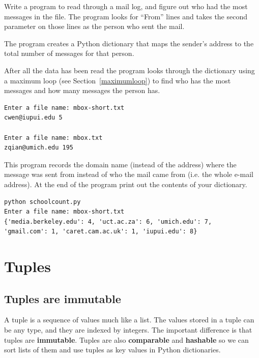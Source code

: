 \documentclass[10pt]{book}
\begin{document}
\begin{ex}
Write a program to read through a mail log, and figure 
out who had the most messages in the file.  The program looks 
for ``From'' lines and takes the second parameter on those 
lines as the person who sent the mail.

The program creates a Python dictionary that maps 
the sender's address to the total number of messages for that person.

After all the data has been read the program looks 
through the dictionary using a maximum loop
 (see Section~\ref{maximumloop})
to find who has the most 
messages and how many messages the person has.

\beforeverb
\begin{verbatim}
Enter a file name: mbox-short.txt
cwen@iupui.edu 5

Enter a file name: mbox.txt
zqian@umich.edu 195
\end{verbatim}
\afterverb
\end{ex}

\begin{ex}
This program records the domain name (instead of the address) 
where the message was sent from instead of who the mail 
came from (i.e. the whole e-mail address). At the end 
of the program print out the contents of your dictionary. 

\beforeverb
\begin{verbatim}
python schoolcount.py
Enter a file name: mbox-short.txt
{'media.berkeley.edu': 4, 'uct.ac.za': 6, 'umich.edu': 7, 
'gmail.com': 1, 'caret.cam.ac.uk': 1, 'iupui.edu': 8}
\end{verbatim}
\afterverb
\end{ex}

\chapter{Tuples}
\label{tuplechap}

\section{Tuples are immutable}


A tuple is a sequence of values much like a list.  
The values stored in a tuple can be any type, and
they are indexed by integers.
The important difference is that tuples are {\bf immutable}.
Tuples are also {\bf comparable} and {\bf hashable} so we can 
sort lists of them and use tuples as key values in Python
dictionaries.
\end{document}
